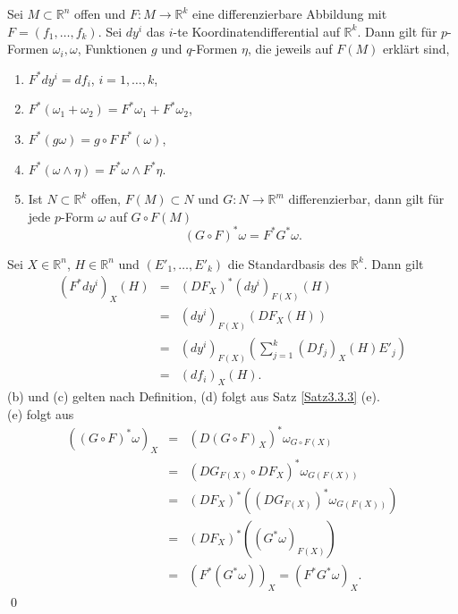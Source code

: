 \documentclass[a4paper,twoside,DIV15,BCOR12mm]{scrbook}
\begin{document}
\begin{satz}\label{Satz3.4.1} {Sei $M \subset {\mathbb R}^{n}$ offen und 
$F: M \to {\mathbb R}^{k}$ eine differenzierbare Abbildung mit 
$F = (f_{1},\dots,f_{k})$. Sei $dy^{i}$ das $i$-te Koordinatendifferential auf 
${\mathbb R}^{k}$. Dann gilt für $p$-Formen $\omega_{i},\omega$, Funktionen $g$ 
und $q$-Formen $\eta$, die jeweils  auf $F(M)$ erklärt sind,}
\begin{enumerate}
\item[{\rm (a)}] $F^{*}dy^{i} = df_{i}$, \qquad $i = 1,\dots,k$,
\item[{\rm (b)}] $F^{*}(\omega_{1} + \omega_{2}) = F^{*}\omega_{1} + F^{*}\omega_{2}$,
\item[{\rm (c)}] $F^{*}(g\omega) = g \circ F\, F^{*}(\omega)$, 
\item[{\rm (d)}] $F^{*}(\omega \wedge \eta) = F^{*}\omega \wedge F^{*}\eta$.
\item[{\rm (e)}] {Ist $N \subset {\mathbb R}^{k}$ offen, $F(M) \subset N$ und $G: N \to {\mathbb R}^{m}$ differenzierbar, dann gilt für jede $p$-Form $\omega$ auf $G \circ F(M)$}
\[ (G \circ F)^{*}\omega = F^{*} G^{*}\omega. \]
\end{enumerate}
\end{satz}

 Sei $X \in {\mathbb R}^{n}$, $H \in {\mathbb R}^{n}$ und $(E'_{1},\dots,E'_{k})$ die Standardbasis des ${\mathbb R}^{k}$. Dann gilt
\begin{eqnarray*}
 (F^{*}dy^{i})_{X}(H) &=& (DF_{X})^{*}(dy^{i})_{F(X)}(H)\\
& = & (dy^{i})_{F(X)}(DF_{X}(H)) \\
& = & (dy^{i})_{F(X)}\left(\sum_{j=1}^{k}(Df_{j})_{X}(H)E'_{j}\right) \\
& = & (df_{i})_{X}(H).
\end{eqnarray*}
(b) und (c) gelten nach Definition, (d) folgt aus Satz \ref{Satz3.3.3} (e).\\

\noindent
(e) folgt aus
\begin{eqnarray*}
((G \circ F)^{*}\omega)_{X} & = & (D(G \circ F)_{X})^{*} \omega_{G \circ F(X)} \\
& = & (DG_{F(X)} \circ DF_{X})^{*} \omega_{G(F(X))} \\
& = & (DF_{X})^{*}\left((DG_{F(X)})^{*} \omega_{G(F(X))}\right) \\
& = & (DF_{X})^{*}\left((G^{*}\omega)_{F(X)}\right) \\
& = & \left(F^{*}(G^{*}\omega)\right)_{X} = (F^{*}G^{*}\omega)_{X}.
\end{eqnarray*}
\qed\\
\end{document}

